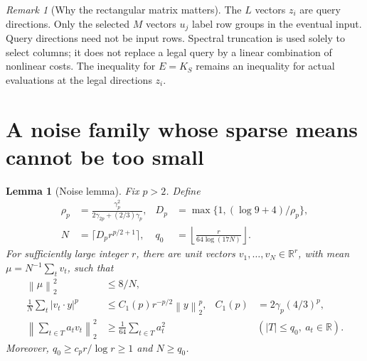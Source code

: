 \documentclass[11pt,letterpaper]{article}
\newtheorem{lemma}[theorem]{Lemma}
\theoremstyle{definition}
\theoremstyle{remark}
\newtheorem{remark}[theorem]{Remark}
\numberwithin{equation}{section}
\newcommand{\R}{\mathbb R}
\newcommand{\norm}[1]{\left\lVert#1\right\rVert}
\begin{document}
\begin{remark}[Why the rectangular matrix matters]\label{rem:rectangular}
The $L$ vectors $z_i$ are query directions. Only the selected $M$ vectors $u_j$ label row groups in the eventual input. Query directions need not be input rows. Spectral truncation is used solely to select columns; it does not replace a legal query by a linear combination of nonlinear costs. The inequality for $E=K_S$ remains an inequality for actual evaluations at the legal directions $z_i$.
\end{remark}

\section{A noise family whose sparse means cannot be too small}\label{sec:noise}
\begin{lemma}[Noise lemma]\label{lem:noise}
Fix $p>2$. Define
\begin{align}
 \rho_p&=\frac{\gamma_p^2}{2\gamma_{2p}+(2/3)\gamma_p},&
 D_p&=\max\{1,(\log9+4)/\rho_p\},\label{eq:noiseconstants}\\
 N&=\lceil D_pr^{p/2+1}\rceil,&
 q_0&=\left\lfloor\frac{r}{64\log(17N)}\right\rfloor.\label{eq:noisecounts}
\end{align}
For sufficiently large integer $r$, there are unit vectors $v_1,\ldots,v_N\in\R^r$, with mean $\mu=N^{-1}\sum_tv_t$, such that
\begin{align}
 \norm{\mu}_2^2&\le8/N,\label{eq:noisemean}\\
 \frac1N\sum_t|v_t\cdot y|^p&\le C_1(p)r^{-p/2}\norm{y}_2^p,
 &C_1(p)&=2\gamma_p(4/3)^p,\label{eq:noisemoment}\\
 \norm{\sum_{t\in T}a_tv_t}_2^2&\ge\frac1{64}\sum_{t\in T}a_t^2
 &&(|T|\le q_0,\ a_t\in\R).\label{eq:noiseRIP}
\end{align}
Moreover, $q_0\ge c_p r/\log r\ge1$ and $N\ge q_0$.
\end{lemma}
\end{document}
